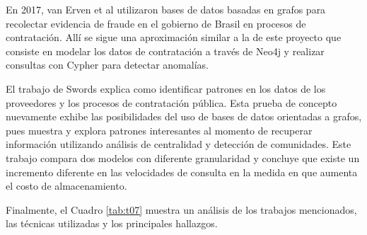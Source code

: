 \documentclass[11pt,letterpaper,oneside]{article}
\begin{document}
	En 2017, van Erven et al \cite{Erven-2017} utilizaron bases de datos basadas en grafos para recolectar evidencia de fraude en el gobierno de Brasil en procesos de contratación. Allí se sigue una aproximación similar a la de este proyecto que consiste en modelar los datos de contratación a través de Neo4j y realizar consultas con Cypher para detectar anomalías.
	
	El trabajo de Swords \cite{Swords-2019} explica como identificar patrones en los datos de los proveedores y los procesos de contratación pública. Esta prueba de concepto nuevamente exhibe las posibilidades del uso de bases de datos orientadas a grafos, pues muestra y explora patrones interesantes al momento de recuperar información utilizando análisis de centralidad y detección de comunidades. Este trabajo compara dos modelos con diferente granularidad y concluye que existe un incremento diferente en las velocidades de consulta en la medida en que aumenta el costo de almacenamiento.
	
	Finalmente, el Cuadro \ref{tab:t07} muestra un análisis de los trabajos mencionados, las técnicas utilizadas y los principales hallazgos.
	
\end{document}
